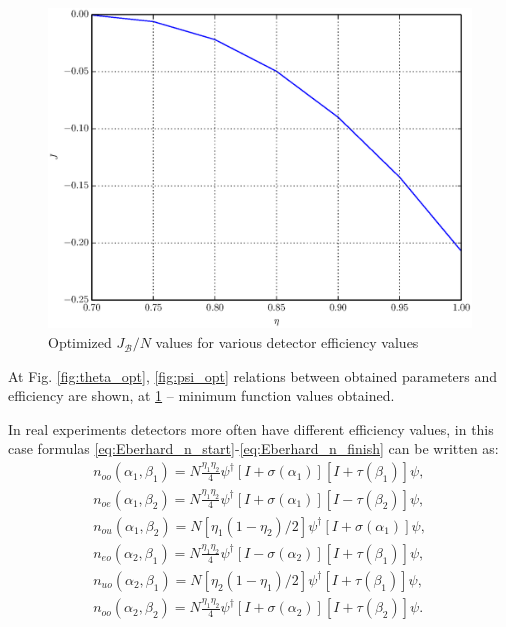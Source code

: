 \documentclass[11pt]{article}
\begin{document}
\begin{figure}[h]
\includegraphics[scale=0.7]{J.eps}
\caption{Optimized $J_{\mathcal{B}}/N$ values for various detector efficiency values}
\label{fig:J_opt}
\end{figure}

At Fig. \ref{fig:theta_opt}, \ref{fig:psi_opt} relations between obtained parameters and efficiency 
are shown, at \ref{fig:J_opt} -- minimum function values obtained.

In real experiments detectors more often have different efficiency values, in this case 
formulas \eqref{eq:Eberhard_n_start}-\eqref{eq:Eberhard_n_finish} can be written as:
\begin{eqnarray*}
n_{oo}(\alpha_1, \beta_1) = N\frac{\eta_1\eta_2}{4}\psi^\dagger[I + \sigma(\alpha_1)][I + \tau(\beta_1)]\psi,\\
n_{oe}(\alpha_1, \beta_2) = N\frac{\eta_1\eta_2}{4}\psi^\dagger[I + \sigma(\alpha_1)][I - \tau(\beta_2)]\psi,\\
n_{ou}(\alpha_1, \beta_2) = N[\eta_1(1 - \eta_2)/2]\psi^\dagger[I + \sigma(\alpha_1)]\psi,\\
n_{eo}(\alpha_2, \beta_1) = N\frac{\eta_1\eta_2}{4}\psi^\dagger[I - \sigma(\alpha_2)][I + \tau(\beta_1)]\psi,\\
n_{uo}(\alpha_2, \beta_1) = N[\eta_2(1 - \eta_1)/2]\psi^\dagger[I + \tau(\beta_1)]\psi,\\
n_{oo}(\alpha_2, \beta_2) = N\frac{\eta_1\eta_2}{4}\psi^\dagger[I + \sigma(\alpha_2)][I + \tau(\beta_2)]\psi.
\end{eqnarray*}
\end{document}
